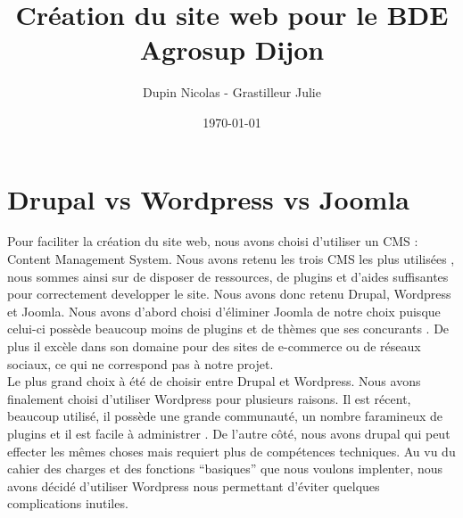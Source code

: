 \documentclass{report}
\title{Création du site web pour le BDE Agrosup Dijon}
\author{Dupin Nicolas - Grastilleur Julie}
\date{\today}
\begin{document}
\section*{Drupal vs Wordpress vs Joomla}

Pour faciliter la création du site web, nous avons choisi d'utiliser un CMS : Content Management System. Nous avons retenu les trois CMS les plus utilisées \cite{popularite1}, nous sommes ainsi sur de disposer de ressources, de plugins et d'aides suffisantes pour correctement developper le site. Nous avons donc retenu Drupal, Wordpress et Joomla. Nous avons d'abord choisi d'éliminer Joomla de notre choix puisque celui-ci possède beaucoup moins de plugins et de thèmes que ses concurants \cite{comparatif1}. De plus il excèle dans son domaine pour des sites de e-commerce ou de réseaux sociaux, ce qui ne correspond pas à notre projet.\\


Le plus grand choix à été de choisir entre Drupal et Wordpress. Nous avons finalement choisi d'utiliser Wordpress pour plusieurs raisons. Il est récent, beaucoup utilisé, il possède une grande communauté, un nombre faramineux de plugins et il est facile à administrer \cite{pourquoiWP1, pourquoiWP2}. De l'autre côté, nous avons drupal qui peut effecter les mêmes choses mais requiert plus de compétences techniques. Au vu du cahier des charges et des fonctions "`basiques"' que nous voulons implenter, nous avons décidé d'utiliser Wordpress nous permettant d'éviter quelques complications inutiles.



\end{document}
